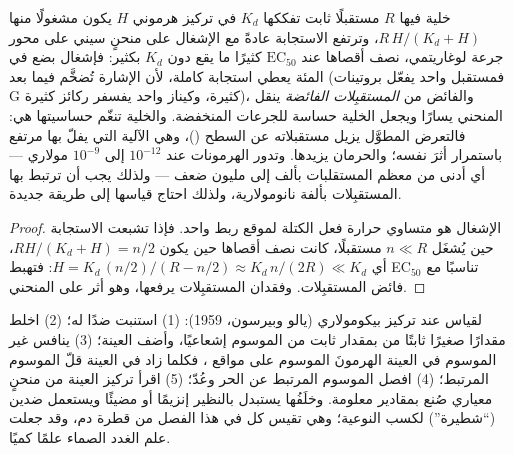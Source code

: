 \begin{proposition}\label{prop:b3:endocrinology:dose}
خلية فيها $R$ مستقبلًا ثابت تفككها $K_{d}$ في تركيز هرموني
$H$ يكون مشغولًا منها $R\,H/(K_{d} + H)$، وترتفع الاستجابة
عادةً مع الإشغال على منحنٍ سيني على محور جرعة لوغاريتمي،
نصف أقصاها عند $\text{EC}_{50}$ كثيرًا ما يقع دون $K_{d}$
بكثير: فإشغال بضع في المئة يعطي استجابة كاملة، لأن الإشارة
تُضخَّم فيما بعد (فمستقبل واحد يفعّل بروتينات G كثيرة،
وكيناز واحد يفسفر ركائز كثيرة)، والفائض من \emph{المستقبِلات
الفائضة} ينقل المنحني يسارًا ويجعل الخلية حساسة للجرعات
المنخفضة. والخلية تنغّم حساسيتها هي: فالتعرض المطوَّل 
يزيل مستقبلاته عن السطح (\emph{})، وهي الآلية
التي يفلّ بها  مرتفع باستمرار أثرَ  نفسه؛
والحرمان يزيدها. وتدور الهرمونات عند $10^{-12}$ إلى
$10^{-9}$ مولاري --- أي أدنى من معظم المستقلبات بألف إلى
مليون ضعف --- ولذلك يجب أن ترتبط بها المستقبِلات بألفة
نانومولارية، ولذلك احتاج قياسها إلى طريقة جديدة.
\end{proposition}
\begin{proof}
الإشغال هو متساوي حرارة فعل الكتلة لموقع ربط واحد. فإذا
تشبعت الاستجابة حين يُشغَل $n \ll R$ مستقبلًا، كانت نصف
أقصاها حين يكون $R H/(K_{d} + H) = n/2$، أي $H = K_{d}\,
(n/2)/(R - n/2) \approx K_{d}\, n/(2R) \ll K_{d}$: فتهبط EC$_{50}$
تناسبًا مع فائض المستقبِلات. وفقدان المستقبِلات يرفعها، وهو
أثر  على المنحني.
\end{proof}

\begin{method}\label{met:b3:endocrinology:ria}
لقياس  عند تركيز بيكومولاري (يالو وبيرسون، 1959): (1)
استنبت ضدًا له؛ (2) اخلط مقدارًا صغيرًا ثابتًا من 
بمقدار ثابت من  الموسوم إشعاعيًا، وأضف العينة؛ (3)
ينافس  غير الموسوم في العينة الهرمونَ الموسوم على
مواقع ، فكلما زاد  في العينة قلّ الموسوم
المرتبط؛ (4) افصل الموسوم المرتبط عن الحر وعُدّ؛ (5) اقرأ
تركيز العينة من منحنٍ معياري صُنع بمقادير معلومة. وخلَفُها
يستبدل بالنظير إنزيمًا أو مضيئًا ويستعمل ضدين (``شطيرة'')
لكسب النوعية؛ وهي تقيس كل  في هذا الفصل من قطرة دم،
وقد جعلت علم الغدد الصماء علمًا كميًا.
\end{method}

